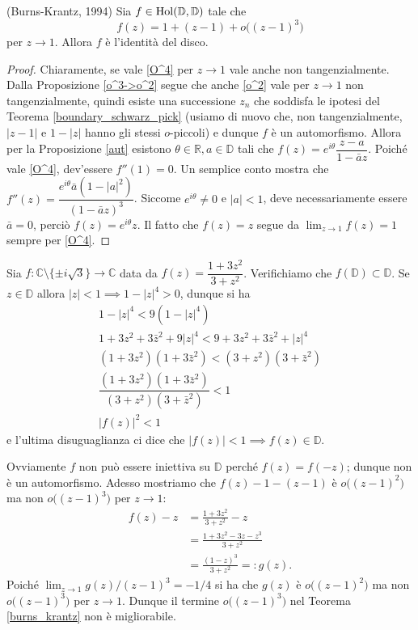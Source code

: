 \begin{thm} \label{burns_krantz} 
  (Burns-Krantz, 1994) Sia $f \in \text{\normalfont{Hol}}(\mathbb{D},\mathbb{D})$ tale che
  \begin{equation} \label{O^4}
    f(z)=1+(z-1)+o\bigl((z-1)^3\bigr)
  \end{equation}
  per $z \longrightarrow 1$. Allora $f$ è l'identità del disco.
\end{thm}

\begin{proof}
  Chiaramente, se vale \eqref{O^4} per $z \longrightarrow 1$ vale anche non tangenzialmente.
  Dalla Proposizione \ref{o^3->o^2} segue che anche \eqref{o^2} vale per $z \longrightarrow 1$ non tangenzialmente, quindi esiste una successione $z_n$ che soddisfa le ipotesi del Teorema \ref{boundary_schwarz_pick} (usiamo di nuovo che, non tangenzialmente, $|z-1|$ e $1-|z|$ hanno gli stessi $o$-piccoli) e dunque $f$ è un automorfismo.
  Allora per la Proposizione \ref{aut} esistono $\theta \in \mathbb{R}, a \in \mathbb{D}$ tali che $f(z)=e^{i\theta}\dfrac{z-a}{1-\bar{a}z}$. Poiché vale \eqref{O^4}, dev'essere $f''(1)=0$. Un semplice conto mostra che $f''(z)=\dfrac{e^{i\theta}\bar{a}(1-|a|^2)}{(1-\bar{a}z)^3}$.
  Siccome $e^{i\theta}\not=0$ e $|a|<1$, deve necessariamente essere $\bar{a}=0$, perciò $f(z)=e^{i\theta}z$. Il fatto che $f(z)=z$ segue da $\displaystyle \lim_{z \longrightarrow 1} f(z)=1$ sempre per \eqref{O^4}.
\end{proof}

\begin{ex}
  Sia $f:\mathbb{C}\setminus\{\pm i\sqrt{3}\} \longrightarrow \mathbb{C}$ data da $f(z)=\dfrac{1+3z^2}{3+z^2}$. Verifichiamo che $f(\mathbb{D}) \subset \mathbb{D}$. Se $z \in \mathbb{D}$ allora $|z|<1 \implies 1-|z|^4>0$, dunque si ha
  \begin{gather*}
    1-|z|^4 < 9(1-|z|^4) \\
    1+3z^2+3\bar{z}^2+9|z|^4 < 9+3z^2+3\bar{z}^2+|z|^4 \\
    (1+3z^2)(1+3\bar{z}^2) < (3+z^2)(3+\bar{z}^2) \\
    \dfrac{(1+3z^2)(1+3\bar{z}^2)}{(3+z^2)(3+\bar{z}^2)} < 1 \\
    |f(z)|^2<1
  \end{gather*}
  e l'ultima disuguaglianza ci dice che $|f(z)|<1 \implies f(z) \in \mathbb{D}$.

  Ovviamente $f$ non può essere iniettiva su $\mathbb{D}$ perché $f(z)=f(-z)$; dunque non è un automorfismo. Adesso mostriamo che $f(z)-1-(z-1)$ è $o\bigl((z-1)^2\bigr)$ ma non $o\bigl((z-1)^3\bigr)$ per $z \longrightarrow 1$:
  \begin{align*}
    f(z)-z & =\frac{1+3z^2}{3+z^2}-z \\
    & =\frac{1+3z^2-3z-z^3}{3+z^2} \\
    & =\frac{(1-z)^3}{3+z^2}=:g(z).
  \end{align*}
  Poiché $\displaystyle \lim_{z \longrightarrow 1} g(z)/(z-1)^3=-1/4$ si ha che $g(z)$ è $o\bigl((z-1)^2\bigr)$ ma non $o\bigl((z-1)^3\bigr)$ per $z \longrightarrow 1$. Dunque il termine $o\bigl((z-1)^3\bigr)$ nel Teorema \ref{burns_krantz} non è migliorabile.
\end{ex}
